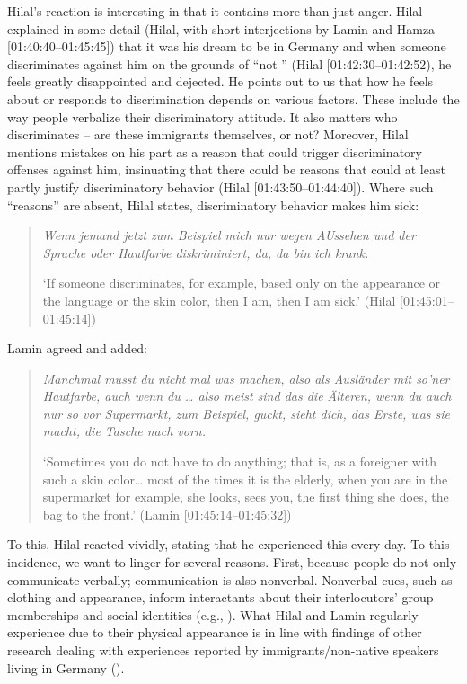 \documentclass[output=paper,colorlinks,citecolor=brown]{langscibook}
\begin{document}
Hilal's reaction is interesting in that it contains more than just anger. Hilal explained in some detail (Hilal, with short interjections by Lamin and Hamza [01:40:40--01:45:45]) that it was his dream to be in Germany and when someone discriminates against him on the grounds of ``not '' (Hilal [01:42:30--01:42:52), he feels greatly disappointed and dejected. He points out to us that how he feels about or responds to discrimination depends on various factors. These include the way people verbalize their discriminatory attitude. It also matters who discriminates -- are these immigrants themselves, or not? Moreover, Hilal mentions mistakes on his part as a reason that could trigger discriminatory offenses against him, insinuating that there could be reasons that could at least partly justify discriminatory behavior (Hilal [01:43:50--01:44:40]). Where such ``reasons'' are absent, Hilal states, discriminatory behavior makes him sick: 
\begin{quote}
\textit{Wenn jemand jetzt zum Beispiel mich nur wegen AUssehen und der Sprache oder Hautfarbe diskriminiert, da, da bin ich krank.}

`If someone discriminates, for example, based only on the appearance or the language or the skin color, then I am, then I am sick.' (Hilal [01:45:01--01:45:14]) 
\end{quote}
Lamin agreed and added: 
\begin{quote}
\textit{Manchmal musst du nicht mal was machen, also als Ausländer mit so'ner Hautfarbe, auch wenn du … also meist sind das die Älteren, wenn du auch nur so vor Supermarkt, zum Beispiel, guckt, sieht dich, das Erste, was sie macht, die Tasche nach vorn.}

`Sometimes you do not have to do anything; that is, as a foreigner with such a skin color… most of the times it is the elderly, when you are in the supermarket for example, she looks, sees you, the first thing she does, the bag to the front.' (Lamin [01:45:14--01:45:32])
\end{quote}

To this, Hilal reacted vividly, stating that he experienced this every day. To this incidence, we want to linger for several reasons. First, because people do not only communicate verbally; communication is also nonverbal. Nonverbal cues, such as clothing and appearance, inform interactants about their interlocutors' group memberships and social identities (e.g., \citealt{giles_maass2016,keblusek_giles_maass2017}). What Hilal and Lamin regularly experience due to their physical appearance is in line with findings of other research dealing with experiences reported by immigrants/non-native speakers living in Germany (\citealt{petrou2023,petrou_dragojevic2024}).
\end{document}

